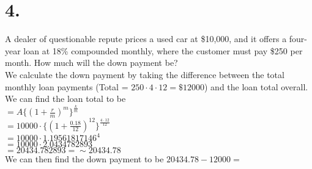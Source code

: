 \documentclass{article}
\begin{document}
\section*{4.}
{\Large 

A dealer of questionable repute prices a used car at \$10,000, and it offers a four-year loan at 18\% compounded monthly, where the customer must pay \$250 per month. How much will the down payment be? \\
We calculate the down payment by taking the difference between the total monthly loan payments (Total = $250 \cdot 4 \cdot 12 = \text{\$}12000$) and the loan total overall. \\
We can find the loan total to be \\
$= A \{(1 + \frac{r}{m})^m\}^{\frac{k}{m}}$ \\
$= 10000 \cdot \{(1 + \frac{0.18}{12})^12\}^{\frac{4 \cdot 12}{12}}$ \\
$= 10000 \cdot 1.19561817146^4$ \\
$= 10000 \cdot 2.0434782893$ \\
$= 20434.782893 = \sim 20434.78$  \\
We can then find the down payment to be $20434.78 - 12000 = $ 

}
\end{document}
